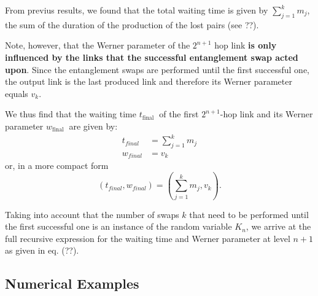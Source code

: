 \documentclass{masterthesis}
\begin{document}
From previus results, we found that the total waiting time is given by $\sum_{j=1}^{k} m_{j}$, the sum of the duration of the production of the lost pairs (see ??). 

Note, however, that the Werner parameter of the $2^{n+1}$ hop link \textbf{is only influenced by the links that the successful entanglement swap acted upon}. Since the entanglement swaps are performed until the first successful one, the output link is the last produced link and therefore its Werner parameter equals $v_{k}$. 

We thus find that the waiting time $t_{\text {final }}$ of the first $2^{n+1}$-hop link and its Werner parameter $w_{\text {final }}$ are given by:
\begin{align}
    t_{final} &= \sum_{j=1}^{k} m_{j} \\ 
    w_{final} &= v_k 
\end{align}
or, in a more compact form
\begin{equation}
    \left(t_{final}, w_{final}\right) = \left(\sum_{j=1}^{k} m_{j}, v_{k}\right) .
\end{equation}

Taking into account that the number of swaps $k$ that need to be performed until the first successful one is an instance of the random variable $K_{n}$, we arrive at the full recursive expression for the waiting time and Werner parameter at level $n+1$ as given in eq. (??). %

\subsection*{Numerical Examples}
\end{document}
